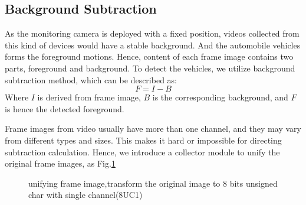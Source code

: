 \documentclass[conference]{IEEEtran}
\begin{document}
	
	\subsection{Background Subtraction}
	As the monitoring camera is deployed with a fixed position, videos collected from this kind of devices would have a stable background. And the automobile vehicles forms the foreground motions. Hence, content of each frame image contains two parts, foreground and background. To detect the vehicles, we utilize background subtraction method, which can be described as:
	\begin{equation}
	F = I  - B
	\label{eq:backgroundSubtraction}
	\end{equation}
	Where $I$ is derived from frame image, $B$ is the corresponding background, and $F$ is hence the detected foreground.
	
	Frame images from video usually have more than one channel, and they may vary from different types and sizes. This makes it hard or impossible for directing subtraction calculation. Hence, we introduce a collector module to unify the original frame images, as Fig.\ref{fig:unifyDiagram}
	\begin{figure}[!h]
	\centering
	\caption{unifying frame image,transform the original image to 8 bits unsigned char with single channel(8UC1)}
	\label{fig:unifyDiagram}
	\end{figure}
	
\end{document}
